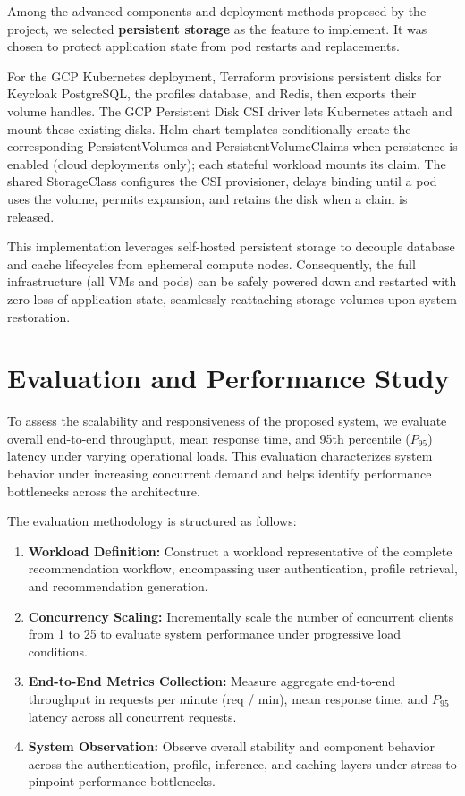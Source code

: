 \documentclass[10pt]{llncs}
\begin{document}
Among the advanced components and deployment methods proposed by the project, we selected \textbf{persistent storage} as the feature to implement. It was chosen to protect application state from pod restarts and replacements.

For the GCP Kubernetes deployment, Terraform provisions persistent disks for Keycloak PostgreSQL, the profiles database, and Redis, then exports their volume handles. The GCP Persistent Disk CSI driver lets Kubernetes attach and mount these existing disks. Helm chart templates conditionally create the corresponding PersistentVolumes and PersistentVolumeClaims when persistence is enabled (cloud deployments only); each stateful workload mounts its claim. The shared StorageClass configures the CSI provisioner, delays binding until a pod uses the volume, permits expansion, and retains the disk when a claim is released.

This implementation leverages self-hosted persistent storage to decouple database and cache lifecycles from ephemeral compute nodes. Consequently, the full infrastructure (all VMs and pods) can be safely powered down and restarted with zero loss of application state, seamlessly reattaching storage volumes upon system restoration.


\section{Evaluation and Performance Study}

To assess the scalability and responsiveness of the proposed system, we evaluate overall end-to-end throughput, mean response time, and 95th percentile ($P_{95}$) latency under varying operational loads. This evaluation characterizes system behavior under increasing concurrent demand and helps identify performance bottlenecks across the architecture.

The evaluation methodology is structured as follows:
\begin{enumerate}
    \item \textbf{Workload Definition:} Construct a workload representative of the complete recommendation workflow, encompassing user authentication, profile retrieval, and recommendation generation.
    \item \textbf{Concurrency Scaling:} Incrementally scale the number of concurrent clients from 1 to 25 to evaluate system performance under progressive load conditions.
    \item \textbf{End-to-End Metrics Collection:} Measure aggregate end-to-end throughput in requests per minute (req / min), mean response time, and $P_{95}$ latency across all concurrent requests.
    \item \textbf{System Observation:} Observe overall stability and component behavior across the authentication, profile, inference, and caching layers under stress to pinpoint performance bottlenecks.
\end{enumerate}
\end{document}
